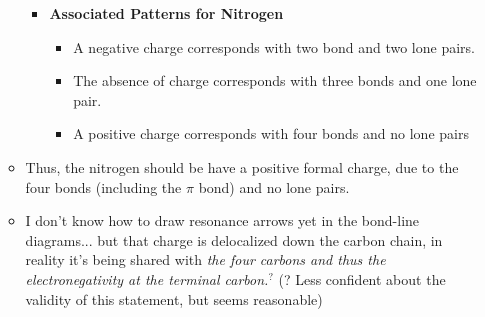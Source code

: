 \documentclass[12pt,a4paper]{article}
\begin{document}
\begin{enumerate}
\begin{itemize}
\begin{itemize}
\begin{itemize}
                \end{itemize}
            \item \textbf{Associated Patterns for Nitrogen}
                \begin{itemize}
                    \item A {\color{neg}negative} charge corresponds with {\color{o-Sun}two bond} and {\color{o-Sun}two lone pairs}.
                    \item The {\color{G-Moon}absence} of charge corresponds with {\color{o-Sun}three bonds} and {\color{o-Sun}one lone pair}.
                    \item A {\color{pos}positive} charge corresponds with {\color{o-Sun}four bonds} and {\color{o-Sun}no lone pairs}
                \end{itemize}
            \end{itemize}
        \item Thus, the nitrogen should be have a {\color{pos}positive formal} charge, due to the four bonds (including the $\pi$  bond) and no lone pairs.
        \item I don't know how to draw resonance arrows yet in the bond-line diagrams... but that charge is {\color{o-Sun}delocalized} down the carbon chain, in reality it's being shared with {\color{y-Sun}\textit{the four carbons and thus the electronegativity at the terminal carbon.\(^{?}\)}} (? Less confident about the validity of this statement, but seems reasonable)
    \end{itemize}
\end{enumerate}
\newpage
{}
\end{document}
